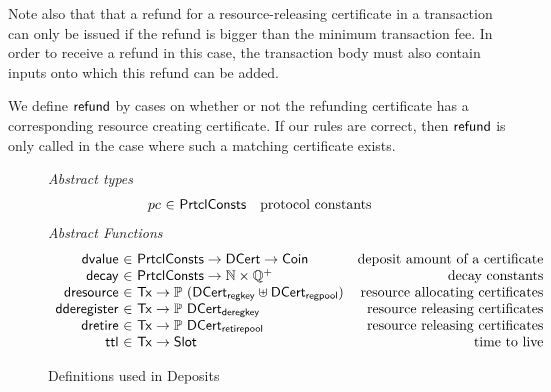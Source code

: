 \documentclass[11pt,a4paper]{article}
\newcommand{\Tx}{\type{Tx}}
\newcommand{\Coin}{\type{Coin}}
\newcommand{\PrtclConsts}{\type{PrtclConsts}}
\newcommand{\Slot}{\type{Slot}}
\newcommand{\DCert}{\type{DCert}}
\newcommand{\DCertRegKey}{\type{DCert_{regkey}}}
\newcommand{\DCertDeRegKey}{\type{DCert_{deregkey}}}
\newcommand{\DCertRegPool}{\type{DCert_{regpool}}}
\newcommand{\DCertRetirePool}{\type{DCert_{retirepool}}}
\theoremstyle{definition}
\theoremstyle{definition}
\begin{document}
Note also that that a refund for a resource-releasing certificate in a
transaction can only be issued if the refund is bigger than the minimum
transaction fee. In order to receive a refund in this case, the transaction
body must also contain inputs onto which this refund can be added.


\begin{note}
  We define $\mathsf{refund}$ by cases on whether or not
  the refunding certificate has a corresponding
  resource creating certificate.
  If our rules are correct, then $\mathsf{refund}$
  is only called in the case where such a matching
  certificate exists.
\end{note}


\begin{figure*}
  \emph{Abstract types}
  \begin{equation*}
    \begin{array}{r@{~\in~}lr}
      pc & \PrtclConsts & \text{protocol constants}
    \end{array}
  \end{equation*}
  \emph{Abstract Functions}
  \begin{equation*}
    \begin{array}{r@{~\in~}lr}
      \fun{dvalue} & \PrtclConsts \to \DCert \to \Coin
        & \text{deposit amount of a certificate}\\

      \fun{decay} & \PrtclConsts \to \mathbb{N}\times\mathbb{Q}^{+}
        & \text{decay constants}\\

      \fun{dresource} & \Tx \to \powerset{(\DCertRegKey \uniondistinct \DCertRegPool)}
        & \text{resource allocating certificates}\\

      \fun{dderegister} & \Tx \to \powerset{\DCertDeRegKey}
        & \text{resource releasing certificates}\\

      \fun{dretire} & \Tx \to \powerset{\DCertRetirePool}
        & \text{resource releasing certificates}\\

      \fun{ttl} & \Tx \to \Slot
        & \text{time to live}\\
    \end{array}
  \end{equation*}
  \caption{Definitions used in Deposits}
  \label{fig:defs:deposits}
\end{figure*}
\end{document}
